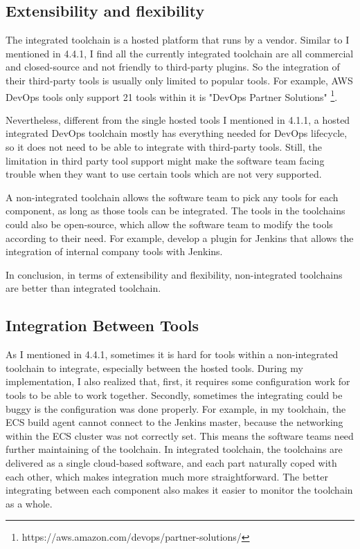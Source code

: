 \subsection{Extensibility and flexibility}
The integrated toolchain is a hosted platform that runs by a vendor. Similar to I mentioned in 4.4.1, I find all the currently integrated toolchain are all commercial and closed-source and not friendly to third-party plugins. So the integration of their third-party tools is usually only limited to popular tools. For example, AWS DevOps tools only support 21 tools within it is "DevOps Partner Solutions" \footnote{https://aws.amazon.com/devops/partner-solutions/}.
\par
Nevertheless, different from the single hosted tools I mentioned in 4.1.1, a hosted integrated DevOps toolchain mostly has everything needed for DevOps lifecycle, so it does not need to be able to integrate with third-party tools. Still, the limitation in third party tool support might make the software team facing trouble when they want to use certain tools which are not very supported.
\par
A non-integrated toolchain allows the software team to pick any tools for each component, as long as those tools can be integrated. The tools in the toolchains could also be open-source, which allow the software team to modify the tools according to their need. For example, develop a plugin for Jenkins that allows the integration of internal company tools with Jenkins.
\par
In conclusion, in terms of extensibility and flexibility, non-integrated toolchains are better than integrated toolchain.
\subsection{Integration Between Tools}
As I mentioned in 4.4.1, sometimes it is hard for tools within a non-integrated toolchain to integrate, especially between the hosted tools. 
During my implementation, I also realized that, first, it requires some configuration work for tools to be able to work together. Secondly, sometimes the integrating could be buggy is the configuration was done properly. For example, in my toolchain, the ECS build agent cannot connect to the Jenkins master, because the networking within the ECS cluster was not correctly set. This means the software teams need further maintaining of the toolchain.
In integrated toolchain, the toolchains are delivered as a single cloud-based software, and each part naturally coped with each other, which makes integration much more straightforward.
The better integrating between each component also makes it easier to monitor the toolchain as a whole.
